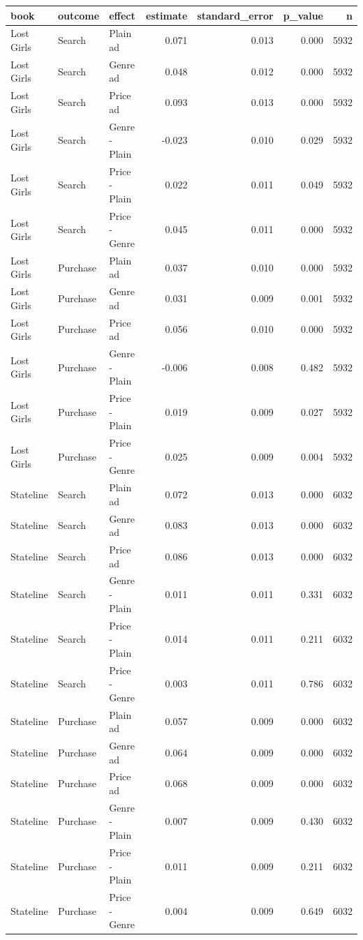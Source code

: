 \begin{tabular}{lllrrrr}
\toprule
book & outcome & effect & estimate & standard_error & p_value & n \\
\midrule
Lost Girls & Search & Plain ad & 0.071 & 0.013 & 0.000 & 5932 \\
Lost Girls & Search & Genre ad & 0.048 & 0.012 & 0.000 & 5932 \\
Lost Girls & Search & Price ad & 0.093 & 0.013 & 0.000 & 5932 \\
Lost Girls & Search & Genre - Plain & -0.023 & 0.010 & 0.029 & 5932 \\
Lost Girls & Search & Price - Plain & 0.022 & 0.011 & 0.049 & 5932 \\
Lost Girls & Search & Price - Genre & 0.045 & 0.011 & 0.000 & 5932 \\
Lost Girls & Purchase & Plain ad & 0.037 & 0.010 & 0.000 & 5932 \\
Lost Girls & Purchase & Genre ad & 0.031 & 0.009 & 0.001 & 5932 \\
Lost Girls & Purchase & Price ad & 0.056 & 0.010 & 0.000 & 5932 \\
Lost Girls & Purchase & Genre - Plain & -0.006 & 0.008 & 0.482 & 5932 \\
Lost Girls & Purchase & Price - Plain & 0.019 & 0.009 & 0.027 & 5932 \\
Lost Girls & Purchase & Price - Genre & 0.025 & 0.009 & 0.004 & 5932 \\
Stateline & Search & Plain ad & 0.072 & 0.013 & 0.000 & 6032 \\
Stateline & Search & Genre ad & 0.083 & 0.013 & 0.000 & 6032 \\
Stateline & Search & Price ad & 0.086 & 0.013 & 0.000 & 6032 \\
Stateline & Search & Genre - Plain & 0.011 & 0.011 & 0.331 & 6032 \\
Stateline & Search & Price - Plain & 0.014 & 0.011 & 0.211 & 6032 \\
Stateline & Search & Price - Genre & 0.003 & 0.011 & 0.786 & 6032 \\
Stateline & Purchase & Plain ad & 0.057 & 0.009 & 0.000 & 6032 \\
Stateline & Purchase & Genre ad & 0.064 & 0.009 & 0.000 & 6032 \\
Stateline & Purchase & Price ad & 0.068 & 0.009 & 0.000 & 6032 \\
Stateline & Purchase & Genre - Plain & 0.007 & 0.009 & 0.430 & 6032 \\
Stateline & Purchase & Price - Plain & 0.011 & 0.009 & 0.211 & 6032 \\
Stateline & Purchase & Price - Genre & 0.004 & 0.009 & 0.649 & 6032 \\
\bottomrule
\end{tabular}
